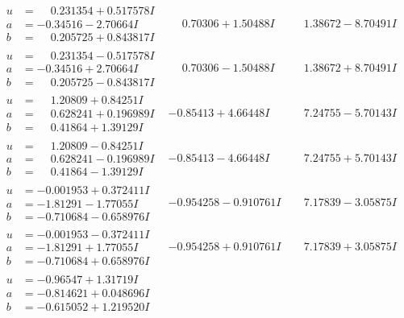 \documentclass[1p]{elsarticle_modified}
\theoremstyle{definition}
\begin{document}
$$\begin{array}{c|c|c}
\begin{aligned}
u &= \phantom{-}0.231354 + 0.517578 I \\
a &= -0.34516 - 2.70664 I \\
b &= \phantom{-}0.205725 + 0.843817 I\end{aligned}
 & \phantom{-}0.70306 + 1.50488 I & \phantom{-}1.38672 - 8.70491 I \\ \hline\begin{aligned}
u &= \phantom{-}0.231354 - 0.517578 I \\
a &= -0.34516 + 2.70664 I \\
b &= \phantom{-}0.205725 - 0.843817 I\end{aligned}
 & \phantom{-}0.70306 - 1.50488 I & \phantom{-}1.38672 + 8.70491 I \\ \hline\begin{aligned}
u &= \phantom{-}1.20809 + 0.84251 I \\
a &= \phantom{-}0.628241 + 0.196989 I \\
b &= \phantom{-}0.41864 + 1.39129 I\end{aligned}
 & -0.85413 + 4.66448 I & \phantom{-}7.24755 - 5.70143 I \\ \hline\begin{aligned}
u &= \phantom{-}1.20809 - 0.84251 I \\
a &= \phantom{-}0.628241 - 0.196989 I \\
b &= \phantom{-}0.41864 - 1.39129 I\end{aligned}
 & -0.85413 - 4.66448 I & \phantom{-}7.24755 + 5.70143 I \\ \hline\begin{aligned}
u &= -0.001953 + 0.372411 I \\
a &= -1.81291 - 1.77055 I \\
b &= -0.710684 - 0.658976 I\end{aligned}
 & -0.954258 - 0.910761 I & \phantom{-}7.17839 - 3.05875 I \\ \hline\begin{aligned}
u &= -0.001953 - 0.372411 I \\
a &= -1.81291 + 1.77055 I \\
b &= -0.710684 + 0.658976 I\end{aligned}
 & -0.954258 + 0.910761 I & \phantom{-}7.17839 + 3.05875 I \\ \hline\begin{aligned}
u &= -0.96547 + 1.31719 I \\
a &= -0.814621 + 0.048696 I \\
b &= -0.615052 + 1.219520 I\end{aligned}

\end{array}$$
\end{document}
